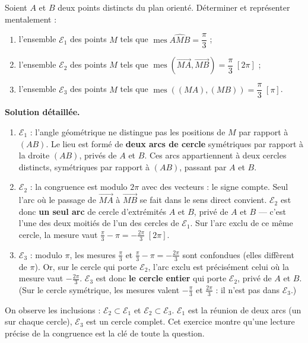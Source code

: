 \documentclass[11pt]{article}
\begin{document}
\begin{exoresolu}
Soient $A$ et $B$ deux points distincts du plan orienté. Déterminer et représenter mentalement :
\begin{enumerate}
\item l'ensemble $\mathcal{E}_1$ des points $M$ tels que $\operatorname{mes}\widehat{AMB} = \dfrac{\pi}{3}$ ;
\item l'ensemble $\mathcal{E}_2$ des points $M$ tels que $\operatorname{mes}(\overrightarrow{MA},\overrightarrow{MB}) = \dfrac{\pi}{3} \;[2\pi]$ ;
\item l'ensemble $\mathcal{E}_3$ des points $M$ tels que $\operatorname{mes}((MA),(MB)) = \dfrac{\pi}{3} \;[\pi]$.
\end{enumerate}
\tcblower
\textbf{Solution détaillée.}
\begin{enumerate}
\item $\mathcal{E}_1$ : l'angle géométrique ne distingue pas les positions de $M$ par rapport à $(AB)$. Le lieu est formé de \textbf{deux arcs de cercle} symétriques par rapport à la droite $(AB)$, privés de $A$ et $B$. Ces arcs appartiennent à deux cercles distincts, symétriques par rapport à $(AB)$, passant par $A$ et $B$.
\item $\mathcal{E}_2$ : la congruence est modulo $2\pi$ avec des vecteurs : le signe compte. Seul l'arc où le passage de $\overrightarrow{MA}$ à $\overrightarrow{MB}$ se fait dans le sens direct convient. $\mathcal{E}_2$ est donc \textbf{un seul arc} de cercle d'extrémités $A$ et $B$, privé de $A$ et $B$ — c'est l'une des deux moitiés de l'un des cercles de $\mathcal{E}_1$. Sur l'arc exclu de ce même cercle, la mesure vaut $\frac{\pi}{3} - \pi = -\frac{2\pi}{3} \;[2\pi]$.
\item $\mathcal{E}_3$ : modulo $\pi$, les mesures $\frac{\pi}{3}$ et $\frac{\pi}{3} - \pi = -\frac{2\pi}{3}$ sont confondues (elles diffèrent de $\pi$). Or, sur le cercle qui porte $\mathcal{E}_2$, l'arc exclu est précisément celui où la mesure vaut $-\frac{2\pi}{3}$. $\mathcal{E}_3$ est donc \textbf{le cercle entier} qui porte $\mathcal{E}_2$, privé de $A$ et $B$. (Sur le cercle symétrique, les mesures valent $-\frac{\pi}{3}$ et $\frac{2\pi}{3}$ : il n'est pas dans $\mathcal{E}_3$.)
\end{enumerate}
On observe les inclusions : $\mathcal{E}_2 \subset \mathcal{E}_1$ et $\mathcal{E}_2 \subset \mathcal{E}_3$. $\mathcal{E}_1$ est la réunion de deux arcs (un sur chaque cercle), $\mathcal{E}_3$ est un cercle complet. Cet exercice montre qu'une lecture précise de la congruence est la clé de toute la question.
\end{exoresolu}
\end{document}
